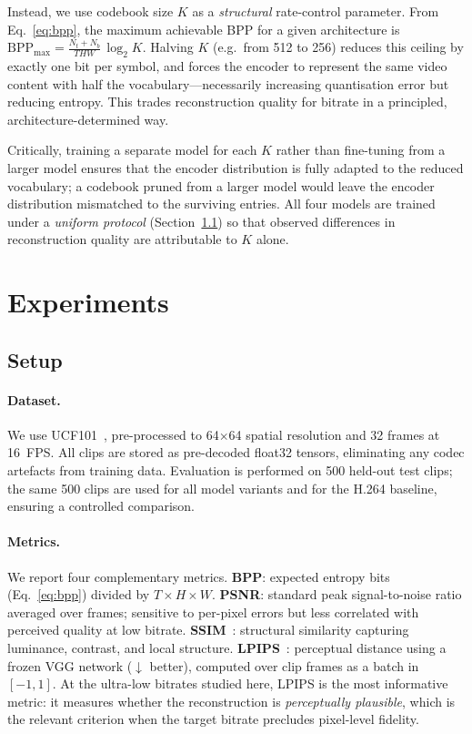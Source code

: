 \documentclass{article}
\begin{document}
Instead, we use codebook size $K$ as a \emph{structural} rate-control
parameter.
From Eq.~\ref{eq:bpp}, the maximum achievable BPP for a given architecture is
$\mathrm{BPP}_{\max} = \frac{N_t + N_b}{T H W}\,\log_2 K$.
Halving $K$ (e.g.\ from 512 to 256) reduces this ceiling by exactly
one bit per symbol, and forces the encoder to represent the same video content
with half the vocabulary---necessarily increasing quantisation error but
reducing entropy.
This trades reconstruction quality for bitrate in a principled, architecture-determined way.

Critically, training a separate model for each $K$ rather than fine-tuning
from a larger model ensures that the encoder distribution is fully adapted to
the reduced vocabulary; a codebook pruned from a larger model would leave the
encoder distribution mismatched to the surviving entries.
All four models are trained under a \emph{uniform protocol}
(Section~\ref{sec:setup}) so that observed differences in reconstruction
quality are attributable to $K$ alone.

\section{Experiments}
\label{sec:experiments}

\subsection{Setup}
\label{sec:setup}

\paragraph{Dataset.}
We use UCF101~\cite{ucf101}, pre-processed to 64$\times$64 spatial resolution
and 32 frames at 16~FPS.
All clips are stored as pre-decoded float32 tensors, eliminating any codec
artefacts from training data.
Evaluation is performed on 500 held-out test clips; the same 500 clips are
used for all model variants and for the H.264 baseline, ensuring a
controlled comparison.

\paragraph{Metrics.}
We report four complementary metrics.
\textbf{BPP}: expected entropy bits (Eq.~\ref{eq:bpp}) divided by $T\!\times\!H\!\times\!W$.
\textbf{PSNR}: standard peak signal-to-noise ratio averaged over frames; sensitive to
per-pixel errors but less correlated with perceived quality at low bitrate.
\textbf{SSIM}~\cite{ssim}: structural similarity capturing luminance, contrast, and
local structure.
\textbf{LPIPS}~\cite{lpips}: perceptual distance using a frozen VGG network
($\downarrow$ better), computed over clip frames as a batch in $[-1,1]$.
At the ultra-low bitrates studied here, LPIPS is the most informative
metric: it measures whether the reconstruction is \emph{perceptually plausible},
which is the relevant criterion when the target bitrate precludes pixel-level
fidelity.
\end{document}
